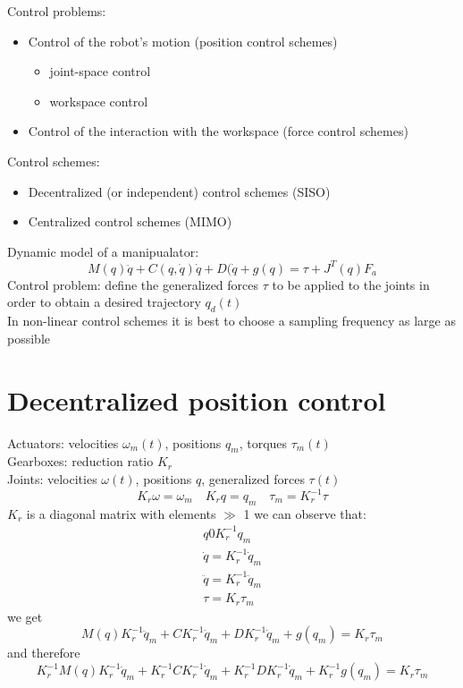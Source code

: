 \documentclass{book}
\begin{document}
Control problems:
\begin{itemize}
    \item Control of the robot's motion (position control schemes)
        \begin{itemize}
            \item joint-space control
            \item workspace control
        \end{itemize}
    \item Control of the interaction with the workspace (force control schemes)
\end{itemize}
Control schemes: 
\begin{itemize}
    \item Decentralized (or independent) control schemes (SISO)
    \item Centralized control schemes (MIMO)
\end{itemize}
Dynamic model of a manipualator:
\[
    M(q)\ddot{q}+C(q,\dot{q})\dot{q}+D(\dot{q}+g(q) = \tau + J^T(q)F_a
\]
Control problem: define the generalized forces $\tau$ to be applied to the joints in order to obtain a desired trajectory $q_d(t)$\\
In non-linear control schemes it is best to choose a sampling frequency as large as possible

\section{Decentralized position control}
Actuators: velocities $\omega_m(t)$, positions $q_m$, torques $\tau_m(t)$\\
Gearboxes: reduction ratio $K_r$\\
Joints: velocities $\omega(t)$, positions $q$, generalized forces $\tau(t)$
\[
    K_r\omega = \omega_m \quad K_rq=q_m \quad \tau_m = K_r^{-1}\tau
\]
$K_r$ is a diagonal matrix with elements  $\gg$ 1
we can observe that:
\begin{gather*}
    q0 K_r^{-1}q_m\\
    \dot{q}=K_r^{-1}\dot{q}_m\\
    \ddot{q}=K_r^{-1}\ddot{q}_m\\
    \tau=K_r\tau_m
\end{gather*}
we get
\[
    M(q)K_r^{-1}\ddot{q}_m + CK_r^{-1}\dot{q}_m+DK_r^{-1}\dot{q}_m+g(q_m)=K_r\tau_m
\]
and therefore
\[
    K_r^{-1}M(q)K_r^{-1}\ddot{q}_m + K_r^{-1}CK_r^{-1}\dot{q}_m+K_r^{-1}DK_r^{-1}\dot{q}_m+K_r^{-1}g(q_m)=K_r\tau_m
\]
\end{document}
